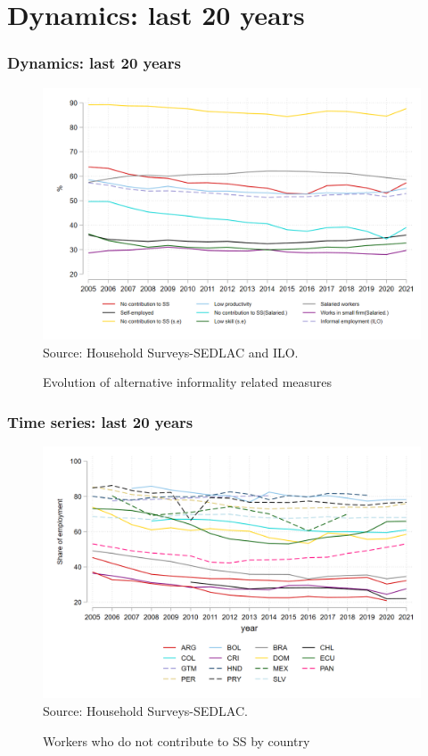 \documentclass{beamer}
\begin{document}

\section{Dynamics: last 20 years}  
\begin{frame}
\frametitle{Dynamics: last 20 years}
\begin{figure}[!htb]
        \justifying
        \caption{Evolution of alternative informality related measures}     
        \includegraphics[width=0.8\linewidth]{latex/figures/Evolution/informality_evolution_LAC.png}
        \label{fig:EvolutionLAC}
        \centering
        \footnotesize{Source: Household Surveys-SEDLAC and ILO.}
 \end{figure}
 \end{frame}
\begin{frame}
\frametitle{Time series: last 20 years}
\begin{figure}[!htb]
        \justifying
        \caption{Workers who do not contribute to SS by country}     
        \includegraphics[width=0.8\linewidth]{latex/figures/Evolution/informal_ss_all.png}
        \label{fig:Evolution_informalSS}
        \centering
        \footnotesize{Source: Household Surveys-SEDLAC.}
 \end{figure}
 \end{frame}
\end{document}
